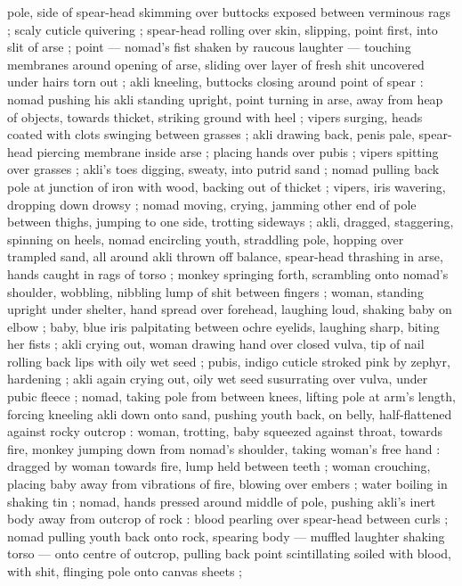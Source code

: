pole, side of spear-head skimming over buttocks exposed between
verminous rags ; scaly cuticle quivering ; spear-head rolling over
skin, slipping, point first, into slit of arse ; point --- nomad’s fist
shaken by raucous laughter --- touching membranes around opening
of arse, sliding over layer of fresh shit uncovered under hairs torn
out ; akli kneeling, buttocks closing around point of spear : nomad
pushing his akli standing upright, point turning in arse, away from
heap of objects, towards thicket, striking ground with heel ; vipers
surging, heads coated with clots swinging between grasses ; akli
drawing back, penis pale, spear-head piercing membrane inside arse
; placing hands over pubis ; vipers spitting over grasses ; akli’s toes
digging, sweaty, into putrid sand ; nomad pulling back pole at
junction of iron with wood, backing out of thicket ; vipers, iris
wavering, dropping down drowsy ; nomad moving, crying, jamming
other end of pole between thighs, jumping to one side, trotting
sideways ; akli, dragged, staggering, spinning on heels, nomad
encircling youth, straddling pole, hopping over trampled sand, all
around akli thrown off balance, spear-head thrashing in arse, hands
caught in rags of torso ; monkey springing forth, scrambling onto
nomad's shoulder, wobbling, nibbling lump of shit between fingers ;
woman, standing upright under shelter, hand spread over forehead,
laughing loud, shaking baby on elbow ; baby, blue iris palpitating
between ochre eyelids, laughing sharp, biting her fists ; akli crying
out, woman drawing hand over closed vulva, tip of nail rolling back
lips with oily wet seed ; pubis, indigo cuticle stroked pink by zephyr,
hardening ; akli again crying out, oily wet seed susurrating over
vulva, under pubic fleece ; nomad, taking pole from between knees,
lifting pole at arm's length, forcing kneeling akli down onto sand,
pushing youth back, on belly, half-flattened against rocky outcrop :
woman, trotting, baby squeezed against throat, towards fire, monkey
jumping down from nomad's shoulder, taking woman's free hand :
dragged by woman towards fire, lump held between teeth ; woman
crouching, placing baby away from vibrations of fire, blowing over
embers ; water boiling in shaking tin ; nomad, hands pressed around
middle of pole, pushing akli's inert body away from outcrop of rock
: blood pearling over spear-head between curls ; nomad pulling
youth back onto rock, spearing body --- muffled laughter shaking
torso --- onto centre of outcrop, pulling back point scintillating
soiled with blood, with shit, flinging pole onto canvas sheets ;
